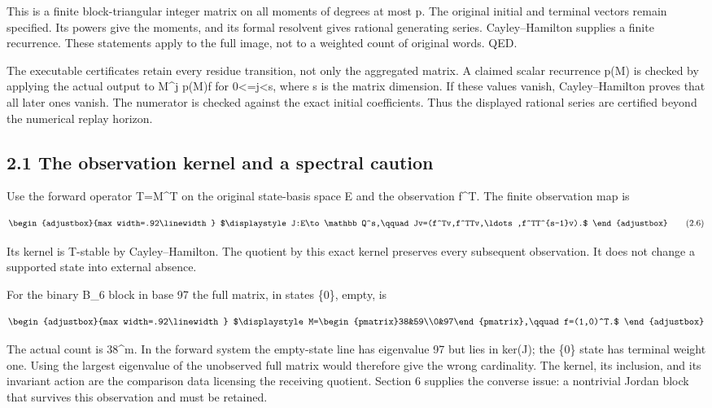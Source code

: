 This is a finite block-triangular integer matrix on all moments of degrees at most p. The original initial and terminal vectors remain specified. Its powers give the moments, and its formal resolvent gives rational generating series. Cayley--Hamilton supplies a finite recurrence. These statements apply to the full image, not to a weighted count of original words. QED.

The executable certificates retain every residue transition, not only the aggregated matrix. A claimed scalar recurrence p(M) is checked by applying the actual output to M\^{}j p(M)f for 0\textless=j\textless s, where s is the matrix dimension. If these values vanish, Cayley--Hamilton proves that all later ones vanish. The numerator is checked against the exact initial coefficients. Thus the displayed rational series are certified beyond the numerical replay horizon.

\subsection{2.1 The observation kernel and a spectral caution}\label{n20-the-observation-kernel-and-a-spectral-caution}

Use the forward operator T=M\^{}T on the original state-basis space E and the observation f\^{}T. The finite observation map is

\[
\begin{adjustbox}{max width=.92\linewidth}
$\displaystyle J:E\to\mathbb Q^s,\qquad
 Jv=(f^Tv,f^TTv,\ldots,f^TT^{s-1}v).$
\end{adjustbox}
\tag{2.6}
\]

Its kernel is T-stable by Cayley--Hamilton. The quotient by this exact kernel preserves every subsequent observation. It does not change a supported state into external absence.

For the binary B\_6 block in base 97 the full matrix, in states \{0\}, empty, is

\[
\begin{adjustbox}{max width=.92\linewidth}
$\displaystyle M=\begin{pmatrix}38&59\\0&97\end{pmatrix},\qquad f=(1,0)^T.$
\end{adjustbox}
\]

The actual count is 38\^{}m. In the forward system the empty-state line has eigenvalue 97 but lies in ker(J); the \{0\} state has terminal weight one. Using the largest eigenvalue of the unobserved full matrix would therefore give the wrong cardinality. The kernel, its inclusion, and its invariant action are the comparison data licensing the receiving quotient. Section 6 supplies the converse issue: a nontrivial Jordan block that survives this observation and must be retained.

